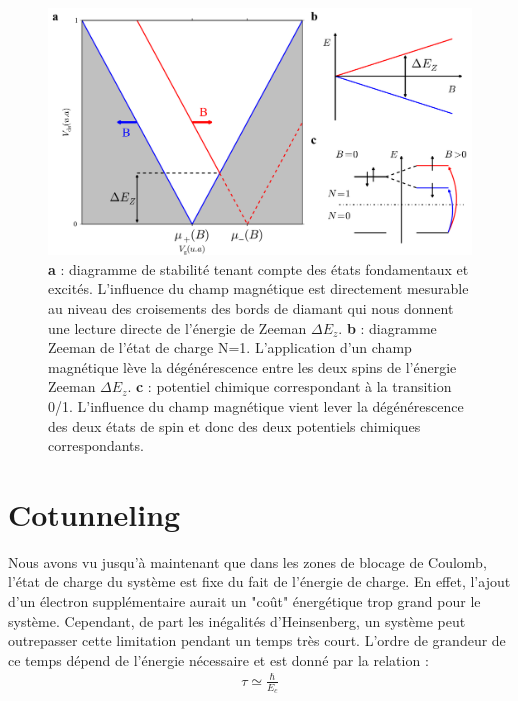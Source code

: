 \begin{figure}
\includegraphics[scale=0.45]{Annexe2/figure4/figure4.pdf} 
\caption{ \textbf{a} : diagramme de stabilité tenant compte des états fondamentaux et excités. L'influence du champ magnétique est directement mesurable au niveau des croisements des bords de diamant qui nous donnent une lecture directe de l'énergie de Zeeman $\Delta E_z$. \textbf{b} : diagramme Zeeman de l'état de charge N=1. L'application d'un champ magnétique lève la dégénérescence entre les deux spins de l'énergie Zeeman $\Delta E_z$. \textbf{c} : potentiel chimique correspondant à la transition 0/1. L'influence du champ magnétique vient lever la dégénérescence des deux états de spin et donc des deux potentiels chimiques correspondants.}
\label{etat_excite}
\end{figure}

\section{Cotunneling}
Nous avons vu jusqu'à maintenant que dans les zones de blocage de Coulomb, l'état de charge du système est fixe du fait de l'énergie de charge. En effet, l'ajout d'un électron supplémentaire aurait un "co\^ut" énergétique trop grand pour le système. Cependant, de part les inégalités d'Heinsenberg, un système peut outrepasser cette limitation pendant un temps très court. L'ordre de grandeur de ce temps dépend de l'énergie nécessaire et est donné par la relation :
\begin{eqnarray}
\tau \simeq \frac{\hbar}{E_c} \nonumber
\end{eqnarray}


